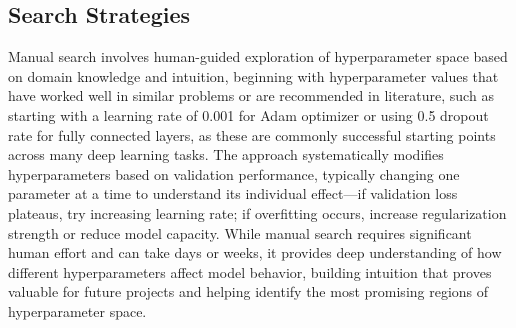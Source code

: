 \begin{table}[h]
\centering
{}
\caption{Priority order for hyperparameter tuning in deep learning.}
\label{tab:hyperparameter-priority}
\end{table}

\subsection{Search Strategies}

Manual search involves human-guided exploration of hyperparameter space based on domain knowledge and intuition, beginning with hyperparameter values that have worked well in similar problems or are recommended in literature, such as starting with a learning rate of 0.001 for Adam optimizer or using 0.5 dropout rate for fully connected layers, as these are commonly successful starting points across many deep learning tasks. The approach systematically modifies hyperparameters based on validation performance, typically changing one parameter at a time to understand its individual effect—if validation loss plateaus, try increasing learning rate; if overfitting occurs, increase regularization strength or reduce model capacity. While manual search requires significant human effort and can take days or weeks, it provides deep understanding of how different hyperparameters affect model behavior, building intuition that proves valuable for future projects and helping identify the most promising regions of hyperparameter space.

